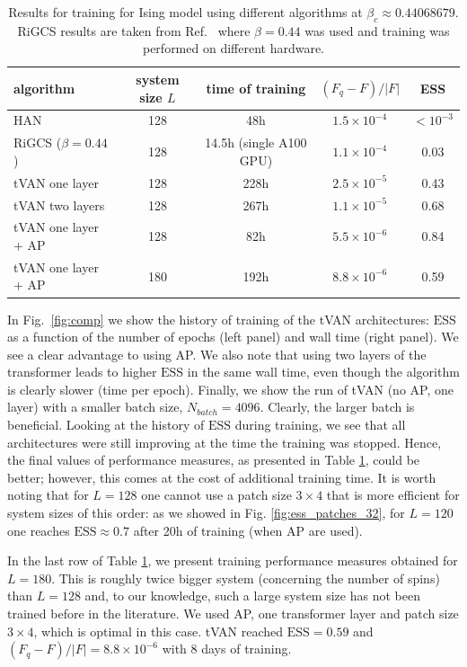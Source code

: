 \documentclass[3p, times,merge]{elsarticle}
\begin{document}
 

\begin{table}
    \centering
    \begin{tabular}{lcccc}
        \toprule
        algorithm & system size $L$ & time of training  & $(F_q-F)/|F|$ & ESS \\
        \midrule
        HAN& 128 & 48h & $1.5 \times 10^{-4}$  & $<10^{-3}$ \\
        RiGCS ($\beta=0.44$) & 128 & 14.5h (single A100 GPU) & $1.1 \times 10^{-4}$ & $0.03$  \\  
        tVAN one layer & 128 & 228h & $2.5 \times 10^{-5}$ & 0.43  \\
        tVAN two layers & 128 & 267h  & $1.1 \times 10^{-5}$  & 0.68 \\
        tVAN one layer + AP & 128 & 82h  & $5.5 \times 10^{-6}$ & 0.84 \\
        tVAN one layer + AP & 180 &  192h & $8.8\times 10^{-6}$ &  0.59  \\ 
        \bottomrule
    \end{tabular}
    \caption{Results for training for Ising model using different algorithms at $\beta_c\approx 0.44068679$. RiGCS results are taken from Ref.~\cite{Singha:2025lsd} where $\beta=0.44$ was used and training was performed on different hardware.  }
    \label{tab:van_han_rigcs}
\end{table}

In Fig.~\ref{fig:comp} we show the history of training of the tVAN architectures: $\text{ESS}$ as a function of the number of epochs (left panel) and wall time (right panel). We see a clear advantage to using AP. We also note that using two layers of the transformer leads to higher $\text{ESS}$ in the same wall time, even though the algorithm is clearly slower (time per epoch). Finally, we show the run of tVAN (no AP, one layer) with a smaller batch size, $N_{batch}=4096$. Clearly, the larger batch is beneficial. Looking at the history of $\text{ESS}$ during training, we see that all architectures were still improving at the time the training was stopped. Hence, the final values of performance measures, as presented in Table \ref{tab:van_han_rigcs}, could be better; however, this comes at the cost of additional training time. It is worth noting that for $L=128$ one cannot use a patch size $3\times4$ that is more efficient for system sizes of this order: as we showed in Fig. \ref{fig:ess_patches_32}, for $L=120$ one reaches $\text{ESS}\approx 0.7$ after 20h of training (when AP are used).

In the last row of Table \ref{tab:van_han_rigcs}, we present training performance measures obtained for $L=180$. This is roughly twice bigger system (concerning the number of spins) than $L=128$ and, to our knowledge, such a large system size has not been trained before in the literature. We used AP, one transformer layer and patch size $3 \times 4$, which is optimal in this case. tVAN reached $\text{ESS}=0.59$ and $(F_q-F)/|F|=8.8\times 10^{-6}$ with 8 days of training. 
\end{document}
